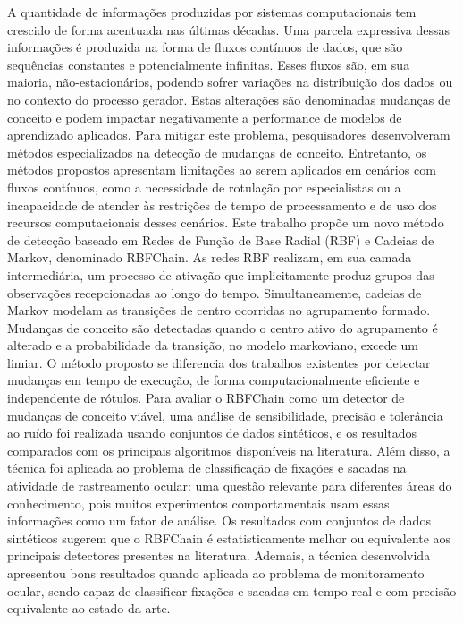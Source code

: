 \documentclass[msc, classic, a4paper]{ufbathesis}
\begin{document}
A quantidade de informações produzidas por sistemas computacionais tem crescido de forma acentuada nas últimas décadas.
Uma parcela expressiva dessas informações é produzida na forma de fluxos contínuos de dados, que são sequências constantes e potencialmente infinitas.
Esses fluxos são, em sua maioria, não-estacionários, podendo sofrer variações na distribuição dos dados ou no contexto do processo gerador.
Estas alterações são denominadas mudanças de conceito e podem impactar negativamente a performance de modelos de aprendizado aplicados.
Para mitigar este problema, pesquisadores desenvolveram métodos especializados na detecção de mudanças de conceito.
Entretanto, os métodos propostos apresentam limitações ao serem aplicados em cenários com fluxos contínuos,
como a necessidade de rotulação por especialistas ou a incapacidade de atender às restrições de tempo de processamento e de uso dos recursos computacionais desses cenários.
Este trabalho propõe um novo método de detecção baseado em Redes de Função de Base Radial (RBF) e Cadeias de Markov, denominado RBFChain.
As redes RBF realizam, em sua camada intermediária, um processo de ativação que implicitamente produz grupos das observações recepcionadas ao longo do tempo.
Simultaneamente, cadeias de Markov modelam as transições de centro ocorridas no agrupamento formado.
Mudanças de conceito são detectadas quando o centro ativo do agrupamento é alterado e a probabilidade da transição, no modelo markoviano, excede um limiar.
O método proposto se diferencia dos trabalhos existentes por detectar mudanças em tempo de execução, de forma computacionalmente eficiente e independente de rótulos.
Para avaliar o RBFChain como um detector de mudanças de conceito viável,
uma análise de sensibilidade, precisão e tolerância ao ruído foi realizada usando conjuntos de dados sintéticos,
e os resultados comparados com os principais algoritmos disponíveis na literatura.
Além disso, a técnica foi aplicada ao problema de classificação de fixações e sacadas na atividade de rastreamento ocular:
uma questão relevante para diferentes áreas do conhecimento,
pois muitos experimentos comportamentais usam essas informações como um fator de análise.
Os resultados com conjuntos de dados sintéticos sugerem que o RBFChain é estatisticamente melhor ou equivalente aos principais detectores presentes na literatura.
Ademais, a técnica desenvolvida apresentou bons resultados quando aplicada ao problema de monitoramento ocular, sendo capaz de classificar fixações e sacadas em tempo real e com precisão equivalente ao estado da arte.
\end{document}

